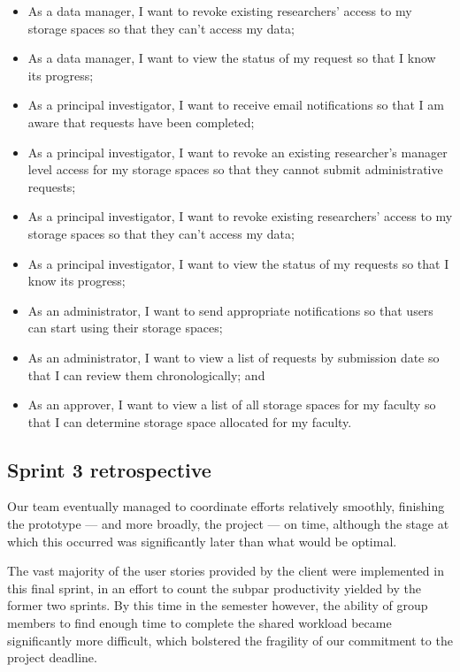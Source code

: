 \documentclass[a4paper,titlepage,12pt]{article}
\begin{document}
\begin{itemize}
	\item As a data manager, I want to revoke existing researchers' access
	      to my storage spaces so that they can't access my data;
	\item As a data manager, I want to view the status of my request so
	      that I know its progress;
	\item As a principal investigator, I want to receive email
	      notifications so that I am aware that requests have been
	      completed;
	\item As a principal investigator, I want to revoke an existing
	      researcher's manager level access for my storage spaces so that
	      they cannot submit administrative requests;
	\item As a principal investigator, I want to revoke existing
	      researchers' access to my storage spaces so that they can't
	      access my data;
	\item As a principal investigator, I want to view the status of my
	      requests so that I know its progress;
	\item As an administrator, I want to send appropriate notifications so
	      that users can start using their storage spaces;
	\item As an administrator, I want to view a list of requests by
	      submission date so that I can review them chronologically; and
	\item As an approver, I want to view a list of all storage spaces for
	      my faculty so that I can determine storage space allocated for
	      my faculty.
\end{itemize}

\subsection{Sprint 3 retrospective}

Our team eventually managed to coordinate efforts relatively smoothly,
finishing the prototype --- and more broadly, the project --- on time, although
the stage at which this occurred was significantly later than what would be
optimal.

The vast majority of the user stories provided by the client were implemented
in this final sprint, in an effort to count the subpar productivity yielded by
the former two sprints. By this time in the semester however, the ability of
group members to find enough time to complete the shared workload became
significantly more difficult, which bolstered the fragility of our commitment
to the project deadline.
\end{document}
